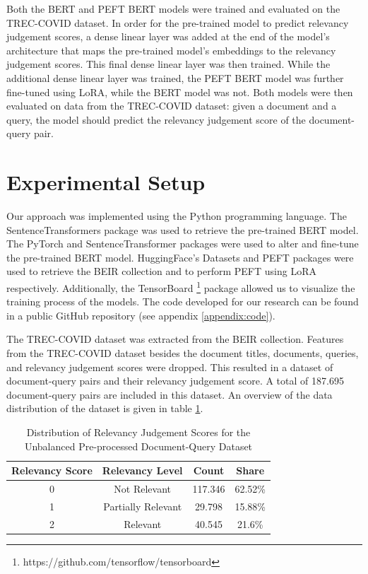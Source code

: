 \documentclass[sigconf, natbib=true]{acmart}
\begin{document}
Both the BERT and PEFT BERT models were trained and evaluated on the TREC-COVID dataset.
In order for the pre-trained model to predict relevancy judgement scores, a dense linear layer was added at the end of the model's architecture that maps the pre-trained model's embeddings to the relevancy judgement scores.
This final dense linear layer was then trained.
While the additional dense linear layer was trained, the PEFT BERT model was further fine-tuned using LoRA, while the BERT model was not.
Both models were then evaluated on data from the TREC-COVID dataset: given a document and a query, the model should predict the relevancy judgement score of the document-query pair.

\section{Experimental Setup}
Our approach was implemented using the Python programming language.
The SentenceTransformers \cite{reimers2019sentencebert} package was used to retrieve the pre-trained BERT model.
The PyTorch and SentenceTransformer packages were used to alter and fine-tune the pre-trained BERT model.
HuggingFace's Datasets \cite{lhoest2021datasets} and PEFT \cite{huggingface2023peft} packages were used to retrieve the BEIR collection and to perform PEFT using LoRA respectively.
Additionally, the TensorBoard \footnote{https://github.com/tensorflow/tensorboard} package allowed us to visualize the training process of the models.
The code developed for our research can be found in a public GitHub repository (see appendix \ref{appendix:code}).

The TREC-COVID dataset was extracted from the BEIR collection.
Features from the TREC-COVID dataset besides the document titles, documents, queries, and relevancy judgement scores were dropped.
This resulted in a dataset of document-query pairs and their relevancy judgement score.
A total of 187.695 document-query pairs are included in this dataset.
An overview of the data distribution of the dataset is given in table \ref{tab:dataset_qrel_distribution}.

\begin{table}
    \centering
    \caption{Distribution of Relevancy Judgement Scores for the Unbalanced Pre-processed Document-Query Dataset}
    \label{tab:dataset_qrel_distribution}
    \begin{tabular}{c c c c}
    \toprule
    \textbf{Relevancy Score} & \textbf{Relevancy Level} & \textbf{Count} & \textbf{Share} \\
    \midrule
    0 & Not Relevant & 117.346 & 62.52\%\\
    1 & Partially Relevant & 29.798 & 15.88\%\\
    2 & Relevant & 40.545 & 21.6\%\\
    \bottomrule
    \end{tabular}
\end{table}
\end{document}
